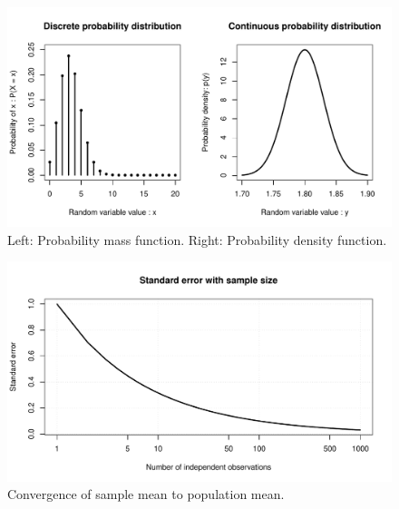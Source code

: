 \documentclass[11pt,a4paper,article]{memoir} %
\begin{document}
\begin{figure}
\includegraphics[width=\textwidth]{probability_distributions.pdf}
\caption{Left: Probability mass function. Right: Probability density function.}
\label{fig:example_pd}
\end{figure}
\begin{figure}
\includegraphics[width=\textwidth]{se_with_sample_size.pdf}
\caption{Convergence of sample mean to population mean.}
\label{fig:se_with_sample_size}
\end{figure}
\par

\newpage
\end{document}
